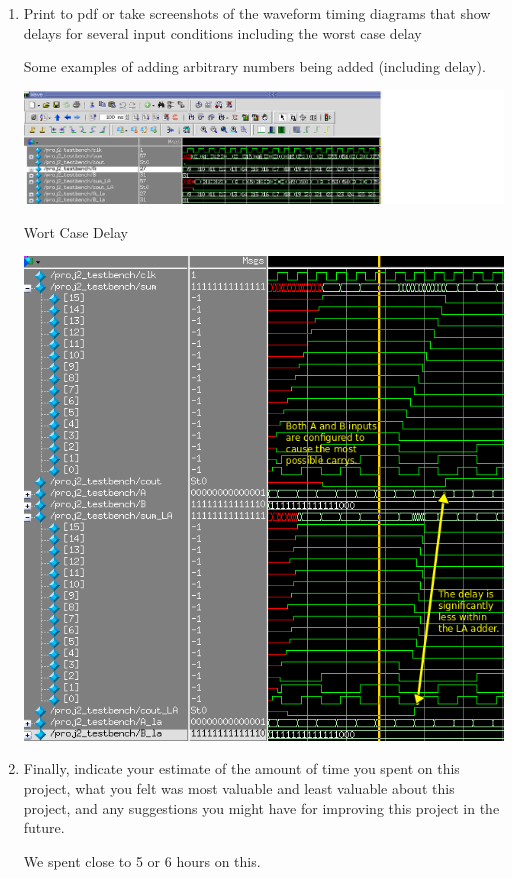 \documentclass[12pt]{article}
\begin{document}
\begin{enumerate}
{\begin{verbatim}
    \end{verbatim}
    }

    \item
    Print to pdf or take screenshots of the waveform timing diagrams that show delays for several input conditions including the worst case delay

    \subitem
    Some examples of adding arbitrary numbers being added (including delay).

    \includegraphics[scale=0.50]{img/correct_math.png}

    \subitem
    Wort Case Delay

    \includegraphics[scale=0.7]{img/worst_case_delay3.png}

    \item
    Finally, indicate your estimate of the amount of time you spent on this project, what you  felt  was  most  valuable  and  least  valuable  about  this  project,  and  any suggestions you might have for improving this project in the future.

    We spent close to 5 or 6 hours on this.
\end{enumerate}
\end{document}
